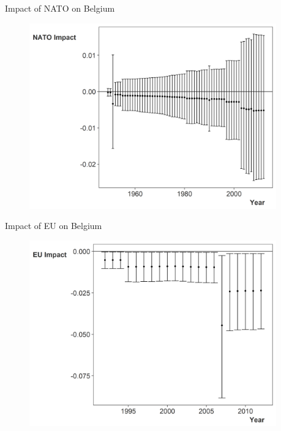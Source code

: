 \documentclass{beamer}
\begin{document}

\begin{frame}{Impact of NATO on Belgium}


\begin{figure}
	\centering
		\includegraphics[width=0.95\textwidth]{bel-nato-imp.png}
\end{figure}


\end{frame}



\begin{frame}{Impact of EU on Belgium}


\begin{figure}
	\centering
		\includegraphics[width=0.95\textwidth]{bel-eu-imp.png}
\end{figure}


\end{frame}
\end{document}
